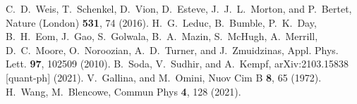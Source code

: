 \documentclass[aps,prl,nofootinbib,preprintnumbers,floatfix,twocolumn,superscriptaddress]{revtex4}
\begin{document}
\begin{thebibliography}{50}
C.~D.~Weis, T.~Schenkel, D.~Vion, D.~Esteve, J.~J.~L.~Morton, 
and P.~Bertet, Nature (London) {\bf 531}, 74 (2016).
H.~G.~Leduc, B.~Bumble, P.~K.~Day, B.~H.~Eom, J.~Gao, S.~Golwala, B.~A.~Mazin, 
S.~McHugh, A.~Merrill, D.~C.~Moore, O.~Noroozian, A.~D.~Turner, and J.~Zmuidzinas, 
Appl. Phys. Lett. {\bf 97}, 102509 (2010).
B.~Soda, V.~Sudhir, and A.~Kempf, arXiv:2103.15838 [quant-ph] (2021). 
V.~Gallina, and M.~Omini, Nuov Cim B {\bf 8}, 65 (1972). 
H.~Wang, M.~Blencowe, Commun Phys {\bf 4}, 128 (2021).
\end{thebibliography}
\end{document}
